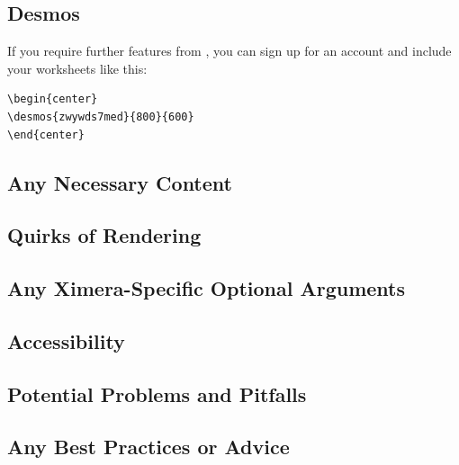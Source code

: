 \documentclass{ximera}
\begin{document}
\subsection{Desmos}

If you require further features from
, you can sign up for an account
and include your worksheets like this:

\begin{verbatim}
\begin{center}
\desmos{zwywds7med}{800}{600}
\end{center}
\end{verbatim}
\begin{center}
\end{center}



    \subsection*{Any Necessary Content}
    
    
    
    \subsection*{Quirks of Rendering}
    
    
    
    \subsection*{Any Ximera-Specific Optional Arguments}
    
    
    
    \subsection*{Accessibility}
    
    
    
    \subsection*{Potential Problems and Pitfalls}
    
    
    
    \subsection*{Any Best Practices or Advice}
    
    

    
\end{document}
